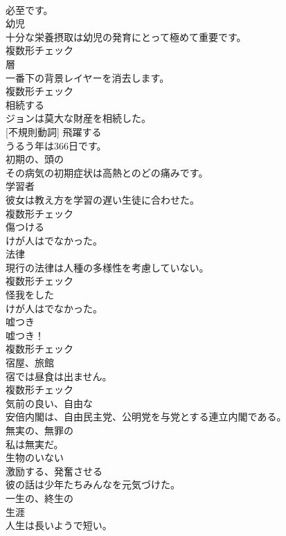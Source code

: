 \documentclass[8pt]{extreport}
\begin{document}
\begin{CJK}{UTF8}{min}
\\	必至です。	
\\	[名詞]	幼児	
\\	十分な栄養摂取は幼児の発育にとって極めて重要です。	
\\	複数形チェック
\\	[名詞]	層	
\\	一番下の背景レイヤーを消去します。	
\\	複数形チェック
\\	[動詞]	相続する	
\\	ジョンは莫大な財産を相続した。	
\\	[動詞] [不規則動詞]	飛躍する	
\\	うるう年は366日です。	
\\	[形容詞]	初期の、頭の	
\\	その病気の初期症状は高熱とのどの痛みです。	
\\	[名詞]	学習者	
\\	彼女は教え方を学習の遅い生徒に合わせた。	
\\	複数形チェック
\\	[動詞]	傷つける	
\\	けが人はでなかった。	
\\	[名詞]	法律	
\\	現行の法律は人種の多様性を考慮していない。	
\\	複数形チェック
\\	[形容詞]	怪我をした	
\\	けが人はでなかった。	
\\	[名詞]	嘘つき	
\\	嘘つき！	
\\	複数形チェック
\\	[名詞]	宿屋、旅館	
\\	宿では昼食は出ません。	
\\	複数形チェック
\\	[形容詞]	気前の良い、自由な	
\\	安倍内閣は、自由民主党、公明党を与党とする連立内閣である。	
\\	[形容詞]	無実の、無罪の	
\\	私は無実だ。	
\\	[形容詞]	生物のいない	
\\	[動詞]	激励する、発奮させる	
\\	彼の話は少年たちみんなを元気づけた。	
\\	[形容詞]	一生の、終生の	
\\	[名詞]	生涯	
\\	人生は長いようで短い。	

\end{CJK}
\end{document}
